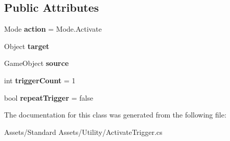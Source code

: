 \subsection*{Public Attributes}
\begin{DoxyCompactItemize}
\item 
Mode {\bfseries action} = Mode.\+Activate\hypertarget{class_unity_standard_assets_1_1_utility_1_1_activate_trigger_a28fc3aac5d0e1054b21199fa04ef251d}{}\label{class_unity_standard_assets_1_1_utility_1_1_activate_trigger_a28fc3aac5d0e1054b21199fa04ef251d}

\item 
Object {\bfseries target}\hypertarget{class_unity_standard_assets_1_1_utility_1_1_activate_trigger_a4e9d860dd1d5ca73584582f3d6162906}{}\label{class_unity_standard_assets_1_1_utility_1_1_activate_trigger_a4e9d860dd1d5ca73584582f3d6162906}

\item 
Game\+Object {\bfseries source}\hypertarget{class_unity_standard_assets_1_1_utility_1_1_activate_trigger_ab0f64a7f9f1ae14bdd05dd20ba9bc81d}{}\label{class_unity_standard_assets_1_1_utility_1_1_activate_trigger_ab0f64a7f9f1ae14bdd05dd20ba9bc81d}

\item 
int {\bfseries trigger\+Count} = 1\hypertarget{class_unity_standard_assets_1_1_utility_1_1_activate_trigger_a2dfd5f275433261a67b8cda441c8291d}{}\label{class_unity_standard_assets_1_1_utility_1_1_activate_trigger_a2dfd5f275433261a67b8cda441c8291d}

\item 
bool {\bfseries repeat\+Trigger} = false\hypertarget{class_unity_standard_assets_1_1_utility_1_1_activate_trigger_a2efeb1eed91a40bce625222c1de6177d}{}\label{class_unity_standard_assets_1_1_utility_1_1_activate_trigger_a2efeb1eed91a40bce625222c1de6177d}

\end{DoxyCompactItemize}


The documentation for this class was generated from the following file\+:\begin{DoxyCompactItemize}
\item 
Assets/\+Standard Assets/\+Utility/Activate\+Trigger.\+cs\end{DoxyCompactItemize}
